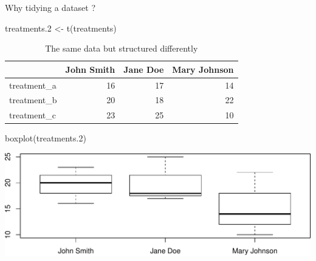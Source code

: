 \documentclass[14pt,ignorenonframetext,]{bredelebeamer}
\newenvironment{Shaded}{\begin{snugshade}}{\end{snugshade}}
\newcommand{\KeywordTok}[1]{\textcolor[rgb]{0.94,0.87,0.69}{#1}}
\newcommand{\DecValTok}[1]{\textcolor[rgb]{0.86,0.86,0.80}{#1}}
\newcommand{\StringTok}[1]{\textcolor[rgb]{0.80,0.58,0.58}{#1}}
\newcommand{\NormalTok}[1]{\textcolor[rgb]{0.80,0.80,0.80}{#1}}
\begin{document}
\begin{frame}[fragile]{Why tidying a dataset ?}

\begin{Shaded}
\begin{Highlighting}[]
\NormalTok{treatments.}\DecValTok{2}\NormalTok{ <-}\StringTok{ }\KeywordTok{t}\NormalTok{(treatments)}
\end{Highlighting}
\end{Shaded}

\begin{center}
\begin{table}[t]

\caption{\label{tab:unnamed-chunk-4}The same data but structured differently}
\centering
\begin{tabular}{l|r|r|r}
\hline
  & John Smith & Jane Doe & Mary Johnson\\
\hline
treatment\_a & 16 & 17 & 14\\
\hline
treatment\_b & 20 & 18 & 22\\
\hline
treatment\_c & 23 & 25 & 10\\
\hline
\end{tabular}
\end{table}
\end{center}

\begin{Shaded}
\begin{Highlighting}[]
\KeywordTok{boxplot}\NormalTok{(treatments.}\DecValTok{2}\NormalTok{)}
\end{Highlighting}
\end{Shaded}

\includegraphics{tidyverse_28_03_files/figure-beamer/boxplot2-1.pdf}

\end{frame}
\end{document}
